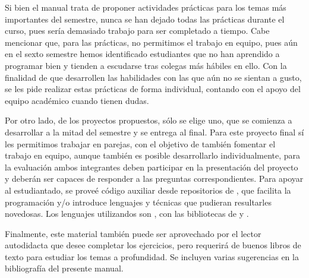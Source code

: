 Si bien el manual trata de proponer actividades prácticas para los temas más importantes del semestre, nunca se han dejado todas las prácticas durante el curso, pues sería demasiado trabajo para ser completado a tiempo.   Cabe mencionar que, para las prácticas, no permitimos el trabajo en equipo, pues aún en el sexto semestre hemos identificado estudiantes que no han aprendido a programar bien y tienden a escudarse tras colegas más hábiles en ello.  Con la finalidad de que desarrollen las habilidades con las que aún no se sientan a gusto, se les pide realizar estas prácticas de forma individual, contando con el apoyo del equipo académico cuando tienen dudas.

Por otro lado, de los proyectos propuestos, sólo se elige uno, que se comienza a desarrollar a la mitad del semestre y se entrega al final.  Para este proyecto final sí les permitimos trabajar en parejas, con el objetivo de también fomentar el trabajo en equipo, aunque también es posible desarrollarlo individualmente, para la evaluación ambos integrantes deben participar en la presentación del proyecto y deberán ser capaces de responder a las preguntas correspondientes.  Para apoyar al estudiantado, se proveé código auxiliar desde repositorios de , que facilita la programación y/o introduce lenguajes y técnicas que pudieran resultarles novedosas.  Los lenguajes utilizandos son \Java, con las bibliotecas de  \parencite{Reas2015} y \Python.

Finalmente, este material también puede ser aprovechado por el lector autodidacta que desee completar los ejercicios, pero requerirá de buenos libros de texto para estudiar los temas a profundidad.  Se incluyen varias sugerencias en la bibliografía del presente manual.

